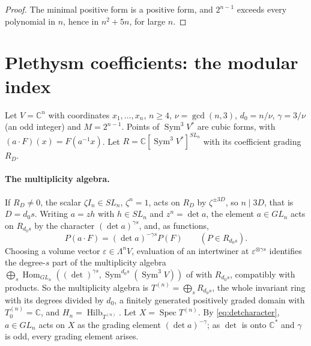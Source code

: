 \documentclass[11pt,a4paper]{article}
\theoremstyle{definition}
\newcommand{\C}{\mathbb{C}}
\newcommand{\Sym}{\operatorname{Sym}}
\newcommand{\Hilb}{\operatorname{Hilb}}
\newcommand{\Spec}{\operatorname{Spec}}
\newcommand{\Hom}{\operatorname{Hom}}
\begin{document}
\begin{proof}
The minimal positive form is a positive form, and $2^{n-1}$ exceeds every
polynomial in $n$, hence in $n^2+5n$, for large $n$.
\end{proof}

\section{Plethysm coefficients: the modular index}\label{sec:plethysm}

Let $V=\C^n$ with coordinates $x_1,\dots,x_n$, $n\ge4$, $\nu=\gcd(n,3)$,
$d_0=n/\nu$, $\gamma=3/\nu$ (an odd integer) and $M=2^{n-1}$. Points of
$\Sym^3V^*$ are cubic forms, with $(a\cdot F)(x)=F(a^{-1}x)$. Let
$R=\C[\Sym^3V^*]^{SL_n}$ with its coefficient grading $R_D$.

\paragraph{The multiplicity algebra.}
If $R_D\ne0$, the scalar $\zeta I_n\in SL_n$, $\zeta^n=1$, acts on $R_D$ by
$\zeta^{\pm3D}$, so $n\mid3D$, that is $D=d_0s$. Writing $a=zh$ with
$h\in SL_n$ and $z^n=\det a$, the element $a\in GL_n$ acts on $R_{d_0s}$ by the
character $(\det a)^{\gamma s}$, and, as functions,
\begin{equation}\label{eq:detcharacter}
 P(a\cdot F)=(\det a)^{-\gamma s}P(F)\qquad(P\in R_{d_0s}).
\end{equation}
Choosing a volume vector $\varepsilon\in\Lambda^nV$, evaluation of an
intertwiner at $\varepsilon^{\otimes\gamma s}$ identifies the degree-$s$ part
of the multiplicity algebra $\bigoplus_s\Hom_{GL_n}((\det)^{\gamma s},
\Sym^{d_0s}(\Sym^3V))$ of \cite[Section 4.1.2, eq.~(4.5)]{GCT6} with $R_{d_0s}$,
compatibly with products. So the multiplicity algebra is
$T^{(n)}=\bigoplus_sR_{d_0s}$, the whole invariant ring with its degrees
divided by $d_0$, a finitely generated positively graded domain with
$T^{(n)}_0=\C$, and $H_n=\Hilb_{T^{(n)}}$. Let $X=\Spec T^{(n)}$. By
\eqref{eq:detcharacter}, $a\in GL_n$ acts on $X$ as the grading element
$(\det a)^{-\gamma}$; as $\det$ is onto $\C^*$ and $\gamma$ is odd, every
grading element arises.
\end{document}
